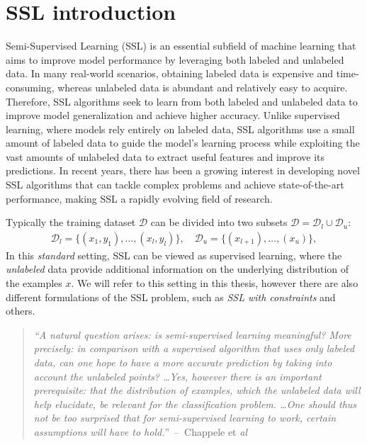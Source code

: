 \section{SSL introduction}
Semi-Supervised Learning (SSL) is an essential subfield of machine learning that aims to improve model performance by leveraging 
both labeled and unlabeled data. In many real-world scenarios, obtaining labeled data is expensive and time-consuming, whereas 
unlabeled data is abundant and relatively easy to acquire. Therefore, SSL algorithms seek to learn from both labeled and unlabeled 
data to improve model generalization and achieve higher accuracy. Unlike supervised learning, where models rely entirely on labeled 
data, SSL algorithms use a small amount of labeled data to guide the model's learning process while exploiting the vast amounts of 
unlabeled data to extract useful features and improve its predictions. In recent years, there has been a growing interest in developing
novel SSL algorithms that can tackle complex problems and achieve state-of-the-art performance, making SSL a rapidly evolving field of 
research. 

Typically the training dataset $\mathcal{D}$ can be divided into two subsets $\mathcal{D} = \mathcal{D}_l \cup \mathcal{D}_u$:
\begin{align*}
    \mathcal{D}_l = \{(x_1,y_1),\dots, (x_l,y_l)\},\quad \mathcal{D}_u = \{(x_{l+1}),\dots,(x_{u})\},
\end{align*}
In this \textit{standard} setting, SSL can be viewed as supervised learning, where 
the \textit{unlabeled} data provide additional information on the underlying distribution of the examples $x$.
We will refer to this setting in this thesis, however there are also different formulations of the SSL problem, such as \textit{SSL with constraints}
 and others\cite[p. 1]{ssl-book-2006}.

\begin{quote}
    \textit{
    ``A natural question arises: is semi-supervised learning meaningful? More precisely:
    in comparison with a supervised algorithm that uses only labeled data, can one
    hope to have a more accurate prediction by taking into account the unlabeled
    points? \dots Yes, however there is an important prerequisite: that the
    distribution of examples, which the unlabeled data will help elucidate, be relevant
    for the classification problem.
    \dots One should thus not be too surprised that for semi-supervised learning to work,
    certain assumptions will have to hold.}''~--~Chappele et \textit{al}\cite[p. 4]{ssl-book-2006}
\end{quote}

